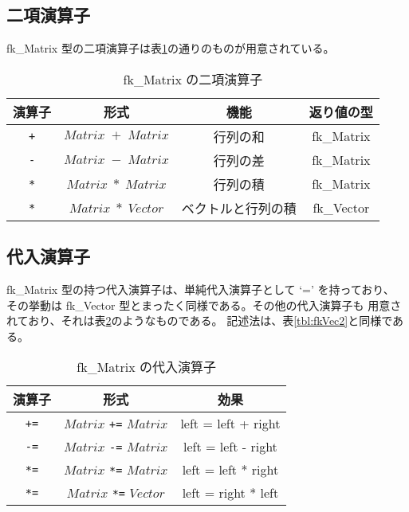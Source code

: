 \subsection{二項演算子}
fk\_Matrix 型の二項演算子は表\ref{tbl:fkMat2}の通りのものが用意されている。
\begin{table}[H]
\caption{fk\_Matrix の二項演算子}
\label{tbl:fkMat2}
\begin{center}
\begin{tabular}{|c|c|c|c|}
\hline
演算子 & 形式 & 機能 & 返り値の型 \\ \hline \hline
\verb-+- & \(Matrix \; + \; Matrix\) & 行列の和 & fk\_Matrix \\ \hline
\verb+-+ & \(Matrix \; - \; Matrix\) & 行列の差 & fk\_Matrix \\ \hline
\verb+*+ & \(Matrix \; * \; Matrix\) & 行列の積 & fk\_Matrix \\ \hline
\verb+*+ & \(Matrix \; * \; Vector\) & ベクトルと行列の積 & fk\_Vector \\ \hline
\end{tabular}
\end{center}
\end{table}

\subsection{代入演算子}
fk\_Matrix 型の持つ代入演算子は、単純代入演算子として `=' を持っており、
その挙動は fk\_Vector 型とまったく同様である。その他の代入演算子も
用意されており、それは表\ref{tbl:fkMat3}のようなものである。
記述法は、表\ref{tbl:fkVec2}と同様である。

\begin{table}[H]
\caption{fk\_Matrix の代入演算子}
\label{tbl:fkMat3}
\begin{center}
\begin{tabular}{|c|c|c|}
\hline
演算子 & 形式 & 効果 \\ \hline \hline
\verb-+=- & \(Matrix\) \verb-+=- \(Matrix\) & left = left + right \\ \hline
\verb+-=+ & \(Matrix\) \verb+-=+ \(Matrix\) & left = left - right \\ \hline
\verb+*=+ & \(Matrix\) \verb+*=+ \(Matrix\) & left = left * right \\ \hline
\verb+*=+ & \(Matrix\) \verb+*=+ \(Vector\) & left = right * left \\ \hline
\end{tabular}
\end{center}
\end{table}
